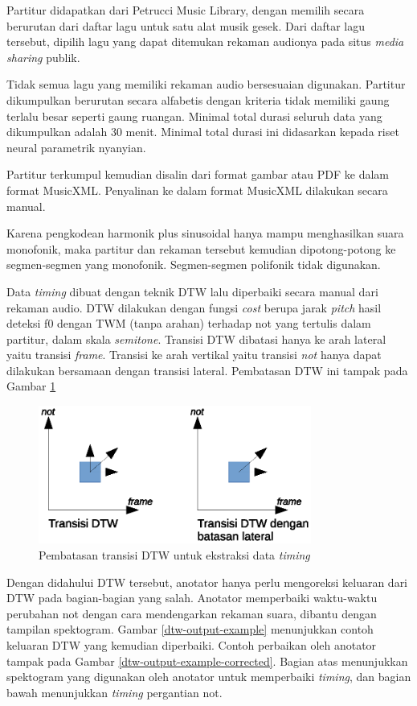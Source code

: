 Partitur didapatkan dari Petrucci Music Library, dengan memilih secara berurutan dari daftar lagu untuk satu alat musik gesek. Dari daftar lagu tersebut, dipilih lagu yang dapat ditemukan rekaman audionya pada situs \textit{media sharing} publik.

Tidak semua lagu yang memiliki rekaman audio bersesuaian digunakan. Partitur dikumpulkan berurutan secara alfabetis dengan kriteria tidak memiliki gaung terlalu besar seperti gaung ruangan. Minimal total durasi seluruh data yang dikumpulkan adalah 30 menit. Minimal total durasi ini didasarkan kepada riset neural parametrik nyanyian.

Partitur terkumpul kemudian disalin dari format gambar atau PDF ke dalam format MusicXML. Penyalinan ke dalam format MusicXML dilakukan secara manual.

Karena pengkodean harmonik plus sinusoidal hanya mampu menghasilkan suara monofonik, maka partitur dan rekaman tersebut kemudian dipotong-potong ke segmen-segmen yang monofonik. Segmen-segmen polifonik tidak digunakan.

Data \textit{timing} dibuat dengan teknik DTW lalu diperbaiki secara manual dari rekaman audio. DTW dilakukan dengan fungsi \textit{cost} berupa jarak \textit{pitch} hasil deteksi f0 dengan TWM (tanpa arahan) terhadap  not yang tertulis dalam partitur, dalam skala \textit{semitone}. Transisi DTW dibatasi hanya ke arah lateral yaitu transisi \textit{frame}. Transisi ke arah vertikal yaitu transisi \textit{not} hanya dapat dilakukan bersamaan dengan transisi lateral. Pembatasan DTW ini tampak pada Gambar \ref{fig-dtw-transition}

\begin{figure}[htb]
    \centering
    \includegraphics[width=0.8\textwidth]{resources/DTW-transition.eps}
    \caption{Pembatasan transisi DTW untuk ekstraksi data \textit{timing}}\label{fig-dtw-transition}
\end{figure}

Dengan didahului DTW tersebut, anotator hanya perlu mengoreksi keluaran dari DTW pada bagian-bagian yang salah. Anotator memperbaiki waktu-waktu perubahan not dengan cara mendengarkan rekaman suara, dibantu dengan tampilan spektogram. Gambar \ref{dtw-output-example} menunjukkan contoh keluaran DTW yang kemudian diperbaiki. Contoh perbaikan oleh anotator tampak pada Gambar \ref{dtw-output-example-corrected}. Bagian atas menunjukkan spektogram yang digunakan oleh anotator untuk memperbaiki \textit{timing}, dan bagian bawah menunjukkan \textit{timing} pergantian not.

